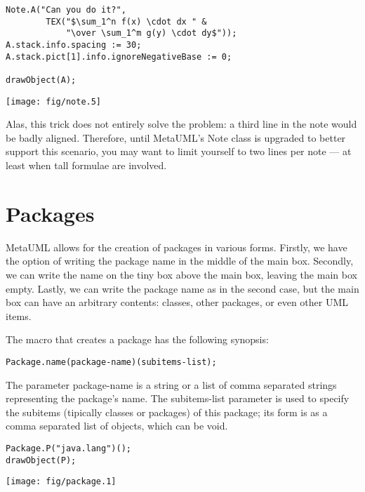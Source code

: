 \documentclass{article}
\newcommand{\code}{\ttfamily}
\begin{document}
\begin{multicols}{2}
\begin{verbatim}
Note.A("Can you do it?", 
        TEX("$\sum_1^n f(x) \cdot dx " &
            "\over \sum_1^m g(y) \cdot dy$"));
A.stack.info.spacing := 30;
A.stack.pict[1].info.ignoreNegativeBase := 0;

drawObject(A);
\end{verbatim}
\columnbreak
\hspace{3cm}\texttt{[image: fig/note.5]}
\end{multicols}

Alas, this trick does not entirely solve the problem: a third line in the note would be badly aligned. Therefore, until MetaUML's {\code Note} class is upgraded to better support this scenario, you may want to limit yourself to two lines per note --- at least when tall formulae are involved.

\section{Packages}

MetaUML allows for the creation of packages in various forms. Firstly, we have the option of writing the package name in the middle of the main box. Secondly, we can write the name on the tiny box above the main box, leaving the main box empty. Lastly, we can write the package name as in the second case, but the main box can have an arbitrary contents: classes, other packages, or even other UML items. 

The macro that creates a package has the following synopsis:

\begin{verbatim}
Package.name(package-name)(subitems-list);
\end{verbatim}

The parameter {\code package-name} is a string or a list of comma separated strings representing the package's name. The {\code subitems-list} parameter is used to specify the subitems (tipically classes or packages) of this package; its form is as a comma separated list of objects, which can be void.

\begin{multicols}{2}
\begin{verbatim}
Package.P("java.lang")();
drawObject(P);
\end{verbatim}
\columnbreak
\hspace{3cm}\texttt{[image: fig/package.1]}
\end{multicols}
\end{document}
